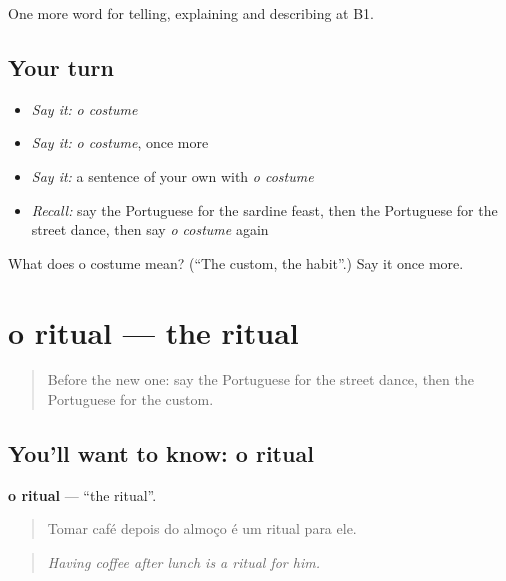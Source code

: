 \begin{grammarlens}[title={What you've built}]
One more word for telling, explaining and describing at B1.
\end{grammarlens}

\subsection*{Your turn}
\begin{itemize}
\raggedright
  \item \emph{Say it:} \emph{o costume}
  \item \emph{Say it:} \emph{o costume}, once more
  \item \emph{Say it:} a sentence of your own with \emph{o costume}
  \item \emph{Recall:} say the Portuguese for the sardine feast, then the Portuguese for the street dance, then say \emph{o costume} again
\end{itemize}

\begin{tcolorbox}[breakable,colback=teal!4,colframe=teal!35!black,title={Before you move on}]
What does o costume mean? (\textquotedblleft{}The custom, the habit\textquotedblright{}.) Say it once more.
\end{tcolorbox}
\section[o ritual]{o ritual — the ritual}

\label{lesson:PT-C320-ritual}



\begin{quote}
Before the new one: say the Portuguese for the street dance, then the Portuguese for the custom.
\end{quote}

\subsection*{You'll want to know: o ritual}
\textbf{o ritual} — \textquotedblleft{}the ritual\textquotedblright{}.

\begin{quote}
Tomar café depois do almoço é um ritual para ele.
\end{quote}

\begin{quote}
\emph{Having coffee after lunch is a ritual for him.}
\end{quote}

